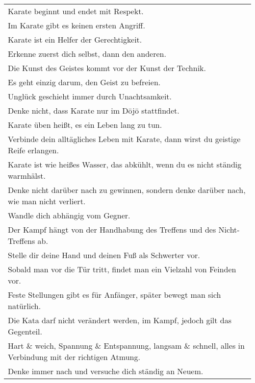 	\null\vfill\null	
	\begin{tabularx}{\textwidth}{X}
			Karate beginnt und endet mit Respekt. \\
			Im Karate gibt es keinen ersten Angriff. \\ 
			Karate ist ein Helfer der Gerechtigkeit. \\
			Erkenne zuerst dich selbst, dann den anderen. \\
			Die Kunst des Geistes kommt vor der Kunst der Technik. \\
			Es geht einzig darum, den Geist zu befreien. \\
			Unglück geschieht immer durch Unachtsamkeit. \\
			Denke nicht, dass Karate nur im D\={o}j\={o} stattfindet. \\
			Karate üben heißt, es ein Leben lang zu tun. \\
			Verbinde dein alltägliches Leben mit Karate, dann wirst du geistige
			Reife erlangen. \\
			Karate ist wie heißes Wasser, das abkühlt, wenn du es nicht ständig
			warmhälst. \\
			Denke nicht darüber nach zu gewinnen, sondern denke darüber nach, wie
			man nicht verliert. \\
			Wandle dich abhängig vom Gegner. \\
			Der Kampf hängt von der Handhabung des Treffens und des Nicht-Treffens
			ab. \\
			Stelle dir deine Hand und deinen Fuß als Schwerter vor. \\
			Sobald man vor die Tür tritt, findet man ein Vielzahl von Feinden vor. \\
			Feste Stellungen gibt es für Anfänger, später bewegt man sich natürlich. \\
			Die Kata darf nicht verändert werden, im Kampf, jedoch gilt das Gegenteil. \\
			Hart \& weich, Spannung \&  Entspannung, langsam \& schnell, alles in
			Verbindung mit der richtigen Atmung. \\
			Denke immer nach und versuche dich ständig an Neuem. \\
	\end{tabularx}\\\null\vfill\null